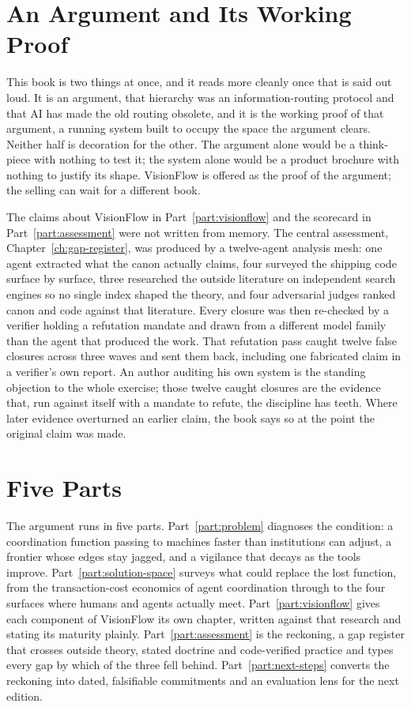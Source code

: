 \section{An Argument and Its Working Proof}

This book is two things at once, and it reads more cleanly once that is said out loud. It is an argument, that hierarchy was an information-routing protocol and that AI has made the old routing obsolete, and it is the working proof of that argument, a running system built to occupy the space the argument clears. Neither half is decoration for the other. The argument alone would be a think-piece with nothing to test it; the system alone would be a product brochure with nothing to justify its shape. VisionFlow is offered as the proof of the argument; the selling can wait for a different book.

\begin{evidencebox}[title={How This Book Was Verified}]
The claims about VisionFlow in Part~\ref{part:visionflow} and the scorecard in Part~\ref{part:assessment} were not written from memory. The central assessment, Chapter~\ref{ch:gap-register}, was produced by a twelve-agent analysis mesh: one agent extracted what the canon actually claims, four surveyed the shipping code surface by surface, three researched the outside literature on independent search engines so no single index shaped the theory, and four adversarial judges ranked canon and code against that literature. Every closure was then re-checked by a verifier holding a refutation mandate and drawn from a different model family than the agent that produced the work. That refutation pass caught twelve false closures across three waves and sent them back, including one fabricated claim in a verifier's own report. An author auditing his own system is the standing objection to the whole exercise; those twelve caught closures are the evidence that, run against itself with a mandate to refute, the discipline has teeth. Where later evidence overturned an earlier claim, the book says so at the point the original claim was made.
\end{evidencebox}

\section{Five Parts}

The argument runs in five parts. Part~\ref{part:problem} diagnoses the condition: a coordination function passing to machines faster than institutions can adjust, a frontier whose edges stay jagged, and a vigilance that decays as the tools improve. Part~\ref{part:solution-space} surveys what could replace the lost function, from the transaction-cost economics of agent coordination through to the four surfaces where humans and agents actually meet. Part~\ref{part:visionflow} gives each component of VisionFlow its own chapter, written against that research and stating its maturity plainly. Part~\ref{part:assessment} is the reckoning, a gap register that crosses outside theory, stated doctrine and code-verified practice and types every gap by which of the three fell behind. Part~\ref{part:next-steps} converts the reckoning into dated, falsifiable commitments and an evaluation lens for the next edition.

